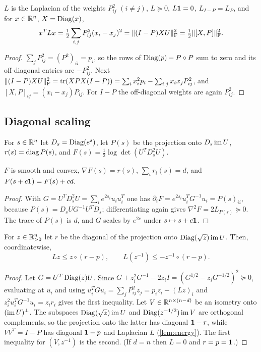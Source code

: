 \begin{lemma}\label{lem:energy}
$L$ is the Laplacian of the weights $P_{ij}^2$ $(i\ne j)$, $L\succeq0$,
$L\mathbf 1=0$, $L_{I-P}=L_P$, and for $x\in\mathbb R^n$, $X=\operatorname{Diag}(x)$,
\[
 x^TLx=\tfrac12\sum_{i,j}P_{ij}^2(x_i-x_j)^2=\lVert (I-P)XU\rVert_{\mathrm F}^2
 =\tfrac12\lVert [X,P]\rVert_{\mathrm F}^2 .
\]
\end{lemma}

\begin{proof}
$\sum_jP_{ij}^2=(P^2)_{ii}=p_i$, so the rows of $\operatorname{Diag}(p)-P\circ P$ sum to zero
and its off-diagonal entries are $-P_{ij}^2$. Next
$\lVert (I-P)XU\rVert_{\mathrm F}^2=\operatorname{tr}(XPX(I-P))=\sum_ix_i^2p_i-\sum_{i,j}x_ix_jP_{ij}^2$, and
$[X,P]_{ij}=(x_i-x_j)P_{ij}$. For $I-P$ the off-diagonal weights are again
$P_{ij}^2$.
\end{proof}

\subsection{Diagonal scaling}

For $s\in\mathbb R^n$ let $D_s=\operatorname{Diag}(e^{s})$, let $P(s)$ be the projection onto
$D_s\operatorname{im} U$, $r(s)=\operatorname{diag} P(s)$, and $F(s)=\frac12\log\det(U^TD_s^2U)$.

\begin{lemma}\label{lem:potential}
$F$ is smooth and convex, $\nabla F(s)=r(s)$, $\sum_ir_i(s)=d$, and
$F(s+c\mathbf 1)=F(s)+cd$.
\end{lemma}

\begin{proof}
With $G=U^TD_s^2U=\sum_ie^{2s_i}u_iu_i^T$ one has
$\partial_iF=e^{2s_i}u_i^TG^{-1}u_i=P(s)_{ii}$, because $P(s)=D_sUG^{-1}U^TD_s$;
differentiating again gives $\nabla^2F=2L_{P(s)}\succeq0$. The trace of $P(s)$ is
$d$, and $G$ scales by $e^{2c}$ under $s\mapsto s+c\mathbf 1$.
\end{proof}

\begin{lemma}\label{lem:scaling-ineq}
For $z\in\mathbb R^n_{>0}$ let $r$ be the diagonal of the projection onto
$\operatorname{Diag}(\sqrt z)\operatorname{im} U$. Then, coordinatewise,
\[
 Lz\le z\circ(r-p),\qquad L(z^{-1})\le-z^{-1}\circ(r-p).
\]
\end{lemma}

\begin{proof}
Let $G=U^T\operatorname{Diag}(z)U$. Since $G+z_i^2G^{-1}-2z_iI=(G^{1/2}-z_iG^{-1/2})^2\succeq0$,
evaluating at $u_i$ and using $u_i^TGu_i=\sum_jP_{ij}^2z_j=p_iz_i-(Lz)_i$ and
$z_i^2u_i^TG^{-1}u_i=z_ir_i$ gives the first inequality. Let
$V\in\mathbb R^{n\times(n-d)}$ be an isometry onto $(\operatorname{im} U)^\perp$. The subspaces
$\operatorname{Diag}(\sqrt z)\operatorname{im} U$ and $\operatorname{Diag}(z^{-1/2})\operatorname{im} V$ are orthogonal complements, so
the projection onto the latter has diagonal $\mathbf 1-r$, while $VV^T=I-P$ has
diagonal $\mathbf 1-p$ and Laplacian $L$ (\cref{lem:energy}). The first inequality
for $(V,z^{-1})$ is the second. (If $d=n$ then $L=0$ and $r=p=\mathbf 1$.)
\end{proof}

